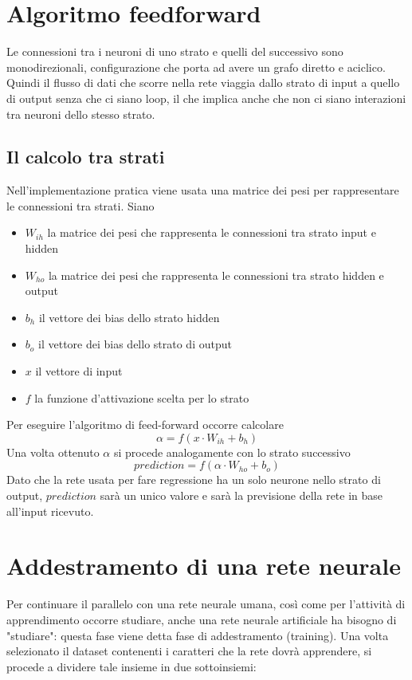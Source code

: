 \documentclass[12pt]{report}
\begin{document}
\section{Algoritmo feedforward}
Le connessioni tra i neuroni di uno strato e quelli del successivo sono monodirezionali, configurazione che porta ad avere un grafo diretto e aciclico. Quindi il flusso di dati che scorre nella rete viaggia dallo strato di input a quello di output senza che ci siano loop, il che implica anche che non ci siano interazioni tra neuroni dello stesso strato.

\subsection{Il calcolo tra strati}
Nell'implementazione pratica viene usata una matrice dei pesi per rappresentare le connessioni tra strati. 
Siano 
\begin{itemize}
\item{$W_{ih}$} la matrice dei pesi che rappresenta le connessioni tra strato input e hidden
\item{$W_{ho}$} la matrice dei pesi che rappresenta le connessioni tra strato hidden e output
\item{$b_h$} il vettore dei bias dello strato hidden
\item{$b_o$} il vettore dei bias dello strato di output
\item{$x$} il vettore di input
\item{$f$} la funzione d'attivazione scelta per lo strato
\end{itemize}
Per eseguire l'algoritmo di feed-forward occorre calcolare
$$\alpha = f\left(x \cdot W_{ih} + b_h\right)$$
Una volta ottenuto $\alpha$ si procede analogamente con lo strato successivo
$$prediction = f\left(\alpha \cdot W_{ho} + b_o\right)$$
Dato che la rete usata per fare regressione ha un solo neurone nello strato di output, $prediction$ sarà un unico valore e sarà la previsione della rete in base all'input ricevuto.

\section{Addestramento di una rete neurale}
Per continuare il parallelo con una rete neurale umana, così come per l'attività di apprendimento occorre studiare, anche una rete neurale artificiale ha bisogno di "studiare": questa fase viene detta fase di addestramento (training).
Una volta selezionato il dataset contenenti i caratteri che la rete dovrà apprendere, si procede a dividere tale insieme in due sottoinsiemi:
\end{document}
